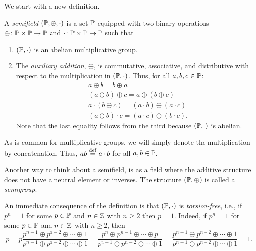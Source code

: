 \medskip

We start with a new definition.
\begin{definition}

	A \emph{semifield} $(\mathbb{P}, \oplus, \cdot)$ is a set
	$\mathbb{P}$ equipped with two binary operations $\oplus \colon \mathbb{P} \times
		\mathbb{P} \to \mathbb{P}$ and $\cdot \colon \mathbb{P} \times \mathbb{P} \to \mathbb{P}$ such that
	\begin{enumerate}
		\item $(\mathbb{P}, \cdot)$ is an abelian multiplicative group.
		\item The \emph{auxiliary addition}, $\oplus$, is commutative,
		      associative, and distributive with respect to the multiplication in $(\mathbb{P}, \cdot)$.
		      Thus, for all $a,b,c \in \mathbb{P}$:
		      \begin{align*}
			       & a \oplus b = b \oplus a                                \\
			       & (a \oplus b) \oplus c =  a \oplus (b \oplus c)         \\
			       & a \cdot (b \oplus c) = (a \cdot b) \oplus (a \cdot c)  \\
			       & (a \oplus b) \cdot c = (a \cdot c) \oplus (b \cdot c).
		      \end{align*}
		      Note that the last equality follows from the third because $(\mathbb{P}, \cdot)$ is abelian.
	\end{enumerate}
	As is common for multiplicative groups, we will simply denote the multiplication by
	concatenation. Thus, $ab \overset{\mathrm{def}}{=} a \cdot b$ for all $a, b \in \mathbb{P}$.
\end{definition}

Another way to think about a semifield, is as a field where the additive structure does
not have a neutral element or inverses. The structure $(\mathbb{P}, \oplus)$ is called a
\emph{semigroup}.

An immediate consequence of the definition is that $(\mathbb{P}, \cdot)$ is
\emph{torsion-free}, i.e., if $p^n = 1$ for some $p\in \mathbb{P}$
and $n \in \mathbb{Z}$ with $n\geq 2$ then $p = 1$. Indeed, if $p^n = 1$ for some $p \in
	\mathbb{P}$ and $n \in \mathbb{Z}$ with $n \geq 2$, then
\begin{equation*}
	p
	= p \frac{p^{n-1} \oplus p^{n-2} \oplus \cdots \oplus 1}{ p^{n-1} \oplus p^{n-2} \oplus \cdots \oplus 1}
	= \frac{p^n \oplus p^{n-1} \oplus \cdots \oplus p}{ p^{n-1} \oplus p^{n-2} \oplus \cdots \oplus 1}
	= \frac{p^{n-1} \oplus p^{n-2} \oplus \cdots \oplus 1}{ p^{n-1} \oplus p^{n-2} \oplus \cdots \oplus 1}
	=1.
\end{equation*}

